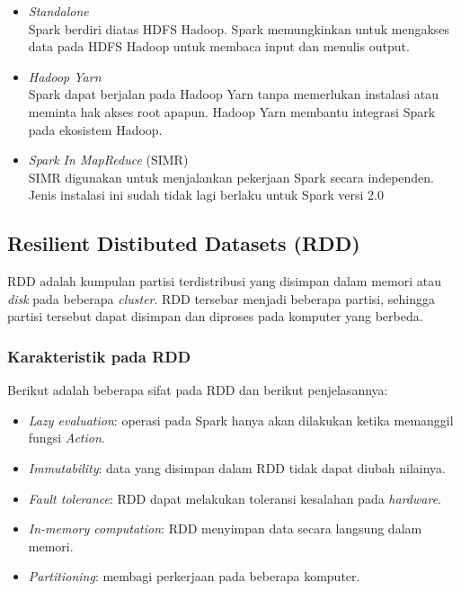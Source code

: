 \begin{itemize}
\item \textit{Standalone}\\  
Spark berdiri diatas HDFS Hadoop. Spark memungkinkan untuk mengakses data pada HDFS Hadoop untuk membaca input dan menulis output.

\item \textit{Hadoop Yarn}\\
Spark dapat berjalan pada Hadoop Yarn tanpa memerlukan instalasi atau meminta hak akses root apapun. Hadoop Yarn membantu integrasi Spark pada ekosistem Hadoop.

\item \textit{Spark In MapReduce} (SIMR)\\ 
SIMR digunakan untuk menjalankan pekerjaan Spark secara independen. Jenis instalasi ini sudah tidak lagi berlaku untuk Spark versi 2.0
\end{itemize}

\subsection{Resilient Distibuted Datasets (RDD)}
\label{sec:rdd}
\par RDD adalah kumpulan partisi terdistribusi yang disimpan dalam memori atau \textit{disk} pada beberapa \textit{cluster}. RDD tersebar menjadi beberapa partisi,  sehingga partisi tersebut dapat disimpan dan diproses pada komputer yang berbeda. 

\subsubsection{Karakteristik pada RDD}
\noindent Berikut adalah beberapa sifat pada RDD dan berikut penjelasannya:
\begin{itemize}
\item \textit{Lazy evaluation}: operasi pada Spark hanya akan dilakukan ketika memanggil fungsi \textit{Action}.

\item \textit{Immutability}: data yang disimpan dalam RDD tidak dapat diubah nilainya. 

\item \textit{Fault tolerance}: RDD dapat melakukan toleransi kesalahan pada \textit{hardware}.

\item \textit{In-memory computation}: RDD menyimpan data secara langsung dalam memori.

\item \textit{Partitioning}: membagi perkerjaan pada beberapa komputer.
\end{itemize}

